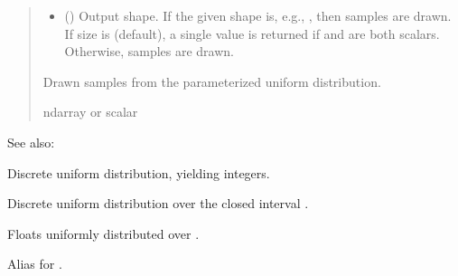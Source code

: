\documentclass[letterpaper,10pt,english]{sphinxmanual}
\begin{document}
\begin{fulllineitems}
\begin{quote}
\begin{description}
\begin{itemize}
\item {} 
\sphinxAtStartPar
{} (\sphinxstyleliteralemphasis{\sphinxupquote{, }}) \textendash{} Output shape.  If the given shape is, e.g., , then
 samples are drawn.  If size is  (default),
a single value is returned if  and  are both scalars.
Otherwise,  samples are drawn.

\end{itemize}

\sphinxAtStartPar
{} \textendash{} Drawn samples from the parameterized uniform distribution.

\sphinxAtStartPar
ndarray or scalar

\end{description}\end{quote}


\begin{sphinxseealso}{See also:}
\begin{description}
\sphinxAtStartPar
Discrete uniform distribution, yielding integers.

\sphinxAtStartPar
Discrete uniform distribution over the closed interval .

\sphinxAtStartPar
Floats uniformly distributed over \sphinxcode{\sphinxupquote{{[}0, 1)}}.

\sphinxAtStartPar
Alias for .


\end{description}
\end{sphinxseealso}
\end{fulllineitems}
\end{document}
